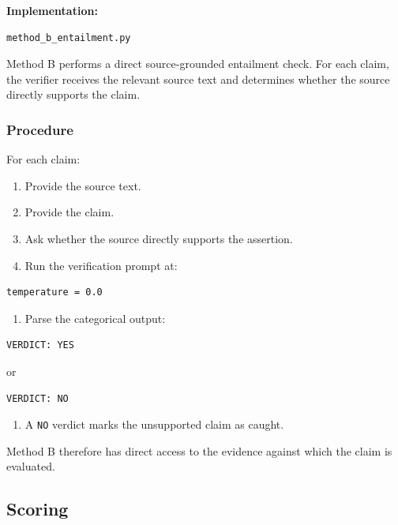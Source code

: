 \documentclass[11pt,a4paper]{article}
\begin{document}
\textbf{Implementation:}

\begin{lstlisting}
method_b_entailment.py
\end{lstlisting}

Method B performs a direct source-grounded entailment check. For each claim, the verifier receives the relevant source text and determines whether the source directly supports the claim.

\subsubsection{Procedure}

For each claim:

\begin{enumerate}
    \item Provide the source text.
    \item Provide the claim.
    \item Ask whether the source directly supports the assertion.
    \item Run the verification prompt at:
\end{enumerate}

\begin{lstlisting}
temperature = 0.0
\end{lstlisting}

\begin{enumerate}[resume]
    \item Parse the categorical output:
\end{enumerate}

\begin{lstlisting}
VERDICT: YES
\end{lstlisting}

or

\begin{lstlisting}
VERDICT: NO
\end{lstlisting}

\begin{enumerate}[resume]
    \item A \texttt{NO} verdict marks the unsupported claim as caught.
\end{enumerate}

Method B therefore has direct access to the evidence against which the claim is evaluated.


\subsection{Scoring}
\end{document}
